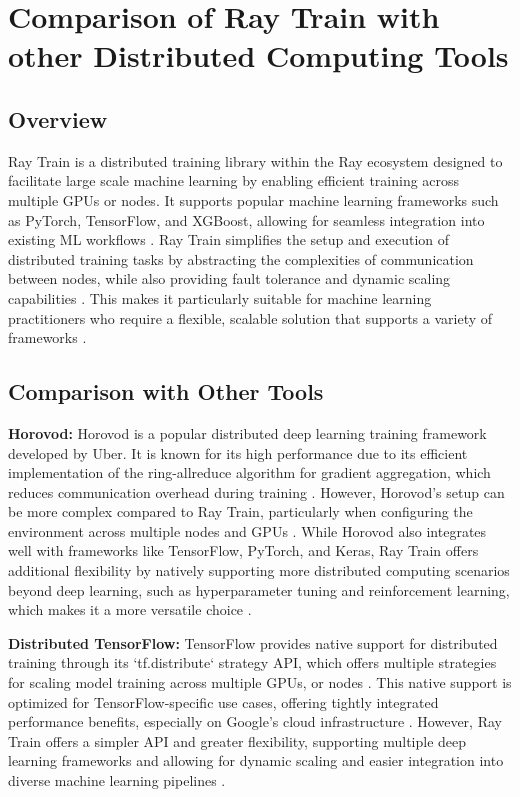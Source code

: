 \section{Comparison of Ray Train with other Distributed Computing Tools}

\subsection{Overview}

Ray Train is a distributed training library within the Ray ecosystem designed to facilitate large scale machine learning by enabling efficient training across multiple GPUs or nodes. It supports popular machine learning frameworks such as PyTorch, TensorFlow, and XGBoost, allowing for seamless integration into existing ML workflows \cite{anyscale_ray_train}. Ray Train simplifies the setup and execution of distributed training tasks by abstracting the complexities of communication between nodes, while also providing fault tolerance and dynamic scaling capabilities \cite{r48}. This makes it particularly suitable for machine learning practitioners who require a flexible, scalable solution that supports a variety of frameworks \cite{r48}.

\subsection{Comparison with Other Tools}

\textbf{Horovod:} Horovod is a popular distributed deep learning training framework developed by Uber. It is known for its high performance due to its efficient implementation of the ring-allreduce algorithm for gradient aggregation, which reduces communication overhead during training \cite{sergeev2018horovod}. However, Horovod's setup can be more complex compared to Ray Train, particularly when configuring the environment across multiple nodes and GPUs \cite{uber2018horovod}. While Horovod also integrates well with frameworks like TensorFlow, PyTorch, and Keras, Ray Train offers additional flexibility by natively supporting more distributed computing scenarios beyond deep learning, such as hyperparameter tuning and reinforcement learning, which makes it a more versatile choice \cite{anyscale_ray_train}.

\textbf{Distributed TensorFlow:} TensorFlow provides native support for distributed training through its `tf.distribute` strategy API, which offers multiple strategies for scaling model training across multiple GPUs, or nodes \cite{tensorflow2023distributed}. This native support is optimized for TensorFlow-specific use cases, offering tightly integrated performance benefits, especially on Google's cloud infrastructure \cite{google2024tensorflow}. However, Ray Train offers a simpler API and greater flexibility, supporting multiple deep learning frameworks and allowing for dynamic scaling and easier integration into diverse machine learning pipelines \cite{anyscale_ray_train}.

